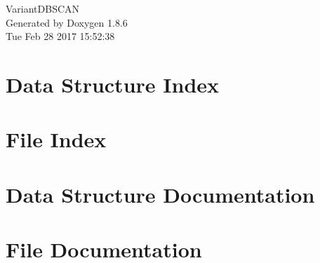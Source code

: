 \documentclass[twoside]{book}
\newcommand{\clearemptydoublepage}{%
  \newpage{\pagestyle{empty}\cleardoublepage}%
}
\begin{document}
\hypersetup{pageanchor=false}
\begin{titlepage}
\vspace*{7cm}
\begin{center}%
{\Large Variant\-D\-B\-S\-C\-A\-N }\\
\vspace*{1cm}
{\large Generated by Doxygen 1.8.6}\\
\vspace*{0.5cm}
{\small Tue Feb 28 2017 15:52:38}\\
\end{center}
\end{titlepage}
\clearemptydoublepage
\tableofcontents
\clearemptydoublepage
{}
\hypersetup{pageanchor=true}

\chapter{Data Structure Index}

\chapter{File Index}

\chapter{Data Structure Documentation}


















\chapter{File Documentation}













\newpage
{}
{}
\printindex
\end{document}
